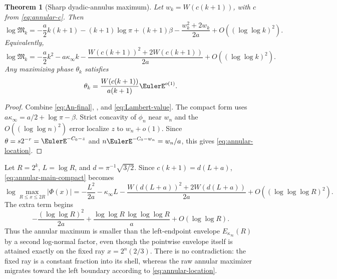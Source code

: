 \documentclass[11pt,oneside]{article}
\newtheorem{theorem}{Theorem}[section]
\theoremstyle{definition}
\theoremstyle{remark}
\newcommand{\Phiup}{\Phi}
\begin{document}
\begin{theorem}[Sharp dyadic-annulus maximum]
\label{thm:annular-main}
Let $w_k=W(c(k+1))$, with $c$ from \eqref{eq:annular-c}.  Then
\begin{equation}
 \boxed{\displaystyle
 \log\mathfrak M_k
 =-\frac a2k(k+1)-(k+1)\log\pi+(k+1)\beta
 -\frac{w_k^2+2w_k}{2a}
 +O((\log\log k)^2).}
 \label{eq:annular-main}
\end{equation}
Equivalently,
\begin{equation}
 \log\mathfrak M_k
 =-\frac a2k^2-a\kappa_\infty k
 -\frac{W(c(k+1))^2+2W(c(k+1))}{2a}
 +O((\log\log k)^2).
 \label{eq:annular-main-compact}
\end{equation}
Any maximizing phase $\theta_k$ satisfies
\begin{equation}
 \theta_k=\frac{W(c(k+1))}{a(k+1)}\EulerE^{o(1)}.
 \label{eq:annular-location}
\end{equation}
\end{theorem}

\begin{proof}
Combine \eqref{eq:An-final}, , and
\eqref{eq:Lambert-value}.  The compact form uses
$a\kappa_\infty=a/2+\log\pi-\beta$.  Strict concavity of $\phi_n$ near $w_n$ and the
$O((\log\log n)^2)$ error localize $z$ to $w_n+o(1)$.  Since
$\theta=s2^{-r}=\EulerE^{-C_0-z}$ and
$n\EulerE^{-C_0-w_n}=w_n/a$, this gives \eqref{eq:annular-location}.
\end{proof}

Let $R=2^k$, $L=\log R$, and $d=\pi^{-1}\sqrt{3/2}$.  Since
$c(k+1)=d(L+a)$, \eqref{eq:annular-main-compact} becomes
\begin{equation}
 \log\max_{R\le x\le2R}|\Phiup(x)|
 =-\frac{L^2}{2a}-\kappa_\infty L
 -\frac{W(d(L+a))^2+2W(d(L+a))}{2a}
 +O((\log\log\log R)^2).
 \label{eq:annular-physical}
\end{equation}
The extra term begins
\begin{equation}
 -\frac{(\log\log R)^2}{2a}
 +\frac{\log\log R\,\log\log\log R}{a}
 +O(\log\log R).
 \label{eq:second-lognormal}
\end{equation}
Thus the annular maximum is smaller than the left-endpoint envelope
$E_{\kappa_\infty}(R)$ by a second log-normal factor, even though the pointwise envelope
itself is attained exactly on the fixed ray $x=2^n(2/3)$.  There is no contradiction: the
fixed ray is a constant fraction into its shell, whereas the raw annular maximizer migrates
toward the left boundary according to \eqref{eq:annular-location}.
\end{document}
